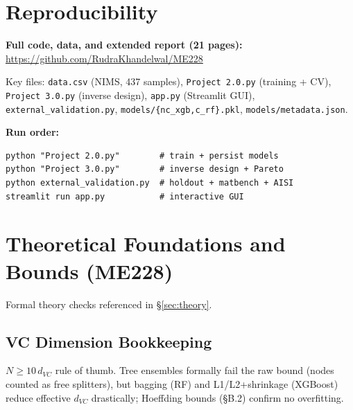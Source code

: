 \documentclass[10pt,a4paper]{article} %
\begin{document}
\appendix
\section{Reproducibility}

\textbf{Full code, data, and extended report (21 pages):}
\url{https://github.com/RudraKhandelwal/ME228}

Key files: \texttt{data.csv} (NIMS, 437 samples), \texttt{Project 2.0.py} (training + CV), \texttt{Project 3.0.py} (inverse design), \texttt{app.py} (Streamlit GUI), \texttt{external\_validation.py}, \texttt{models/\{nc\_xgb,c\_rf\}.pkl}, \texttt{models/metadata.json}.

\textbf{Run order:}
\begin{lstlisting}
python "Project 2.0.py"        # train + persist models
python "Project 3.0.py"        # inverse design + Pareto
python external_validation.py  # holdout + matbench + AISI
streamlit run app.py           # interactive GUI
\end{lstlisting}

\section{Theoretical Foundations and Bounds (ME228)}\label{app:theory}

Formal theory checks referenced in §\ref{sec:theory}.

\subsection{VC Dimension Bookkeeping}

$N \geq 10\,d_{VC}$ rule of thumb. Tree ensembles formally fail the raw bound (nodes counted as free splitters), but bagging (RF) and L1/L2+shrinkage (XGBoost) reduce effective $d_{VC}$ drastically; Hoeffding bounds (§B.2) confirm no overfitting.
\end{document}
